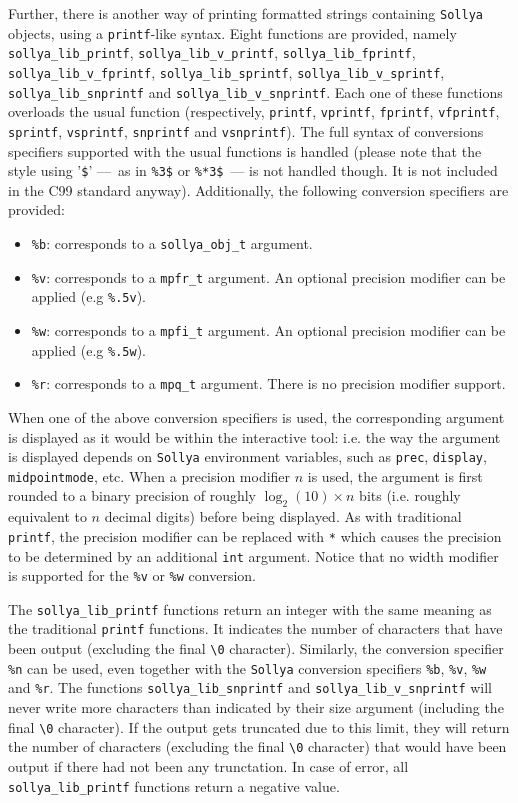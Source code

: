\documentclass[a4paper]{article}
\newcommand{\sollya}{\texttt{Sollya}\xspace}
\begin{document}
Further, there is another way of printing formatted strings containing \sollya objects, using a {\tt printf}-like syntax. Eight functions are provided, namely \verb|sollya_lib_printf|, \verb|sollya_lib_v_printf|, \verb|sollya_lib_fprintf|, \verb|sollya_lib_v_fprintf|, \verb|sollya_lib_sprintf|, \verb|sollya_lib_v_sprintf|, \verb|sollya_lib_snprintf| and \verb|sollya_lib_v_snprintf|. Each one of these functions overloads the usual function (respectively, \verb|printf|, \verb|vprintf|, \verb|fprintf|, \verb|vfprintf|, \verb|sprintf|, \verb|vsprintf|, \verb|snprintf| and \verb|vsnprintf|). The full syntax of conversions specifiers supported with the usual functions is handled (please note that the style using '\verb|$|' ---~as in \verb|%3$| or \verb|%*3$|~--- is not handled though. It is not included in the C99 standard anyway). Additionally, the following conversion specifiers are provided:
\begin{itemize}
\item \verb|%b|: corresponds to a \verb|sollya_obj_t| argument.
\item \verb|%v|: corresponds to a \verb|mpfr_t| argument. An optional precision modifier can be applied (e.g \verb|%.5v|).
\item \verb|%w|: corresponds to a \verb|mpfi_t| argument. An optional precision modifier can be applied (e.g \verb|%.5w|).
\item \verb|%r|: corresponds to a \verb|mpq_t| argument. There is no precision modifier support.
\end{itemize}
When one of the above conversion specifiers is used, the corresponding argument is displayed as it would be within the interactive tool: i.e. the way the argument is displayed depends on \sollya environment variables, such as \verb|prec|, \verb|display|, \verb|midpointmode|, etc. When a precision modifier $n$ is used, the argument is first rounded to a binary precision of roughly $\log_2(10)\times n$ bits (i.e. roughly equivalent to $n$ decimal digits) before being displayed. As with traditional \verb|printf|, the precision modifier can be replaced with \verb|*| which causes the precision to be determined by an additional \verb|int| argument. Notice that no width modifier is supported for the \verb|%v| or \verb|%w| conversion.

The \verb|sollya_lib_printf| functions return an integer with the same meaning as the traditional \verb|printf| functions. It indicates the number of characters that have been output (excluding the final \verb|\0| character). Similarly, the conversion specifier \verb|%n| can be used, even together with the \sollya conversion specifiers \verb|%b|, \verb|%v|, \verb|%w| and \verb|%r|. The functions \verb|sollya_lib_snprintf| and \verb|sollya_lib_v_snprintf| will
never write more characters than indicated by their size argument (including the final \verb|\0| character). If the output gets truncated due to this limit, they will return the number of characters (excluding the final \verb|\0| character) that would have been output if there had not been any trunctation. In case of error, all \verb|sollya_lib_printf| functions return a negative value.
\end{document}
